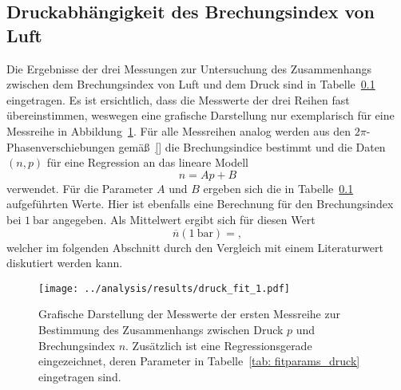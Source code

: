 

\subsection{Druckabhängigkeit des Brechungsindex von Luft}
Die Ergebnisse der drei Messungen zur Untersuchung des Zusammenhangs zwischen dem Brechungsindex von Luft und dem Druck sind in 
Tabelle~\ref{} eingetragen. Es ist ersichtlich, dass die Messwerte der drei Reihen fast übereinstimmen, weswegen eine grafische
Darstellung nur exemplarisch für eine Messreihe in Abbildung~\ref{fig: fit_druck}. Für alle Messreihen analog werden aus 
den $2\pi$-Phasenverschiebungen gemäß~\eqref{} die Brechungsindice bestimmt und die Daten $(n, p)$ für eine Regression an 
das lineare Modell
\begin{equation}
    n = A p + B
\end{equation}
verwendet. Für die Parameter $A$ und $B$ ergeben sich die in Tabelle~\ref{} aufgeführten Werte. Hier ist ebenfalls eine 
Berechnung für den Brechungsindex bei $\SI{1}{\bar}$ angegeben. Als Mittelwert ergibt sich für diesen Wert
\begin{equation}
    \overline{n}\left(\SI{1}{\bar} \right) = ,
\end{equation}
welcher im folgenden Abschnitt durch den Vergleich mit einem Literaturwert%
diskutiert werden kann. 

\begin{figure}
    \centering
    \texttt{[image: ../analysis/results/druck\_fit\_1.pdf]}
    \label{fig: fit_druck}
    \caption{Grafische Darstellung der Messwerte der ersten Messreihe zur Bestimmung des Zusammenhangs zwischen 
    Druck $p$ und Brechungsindex $n$. Zusätzlich ist eine Regressionsgerade eingezeichnet, deren Parameter in 
    Tabelle~\ref{tab: fitparams_druck} eingetragen sind.}
\end{figure}







